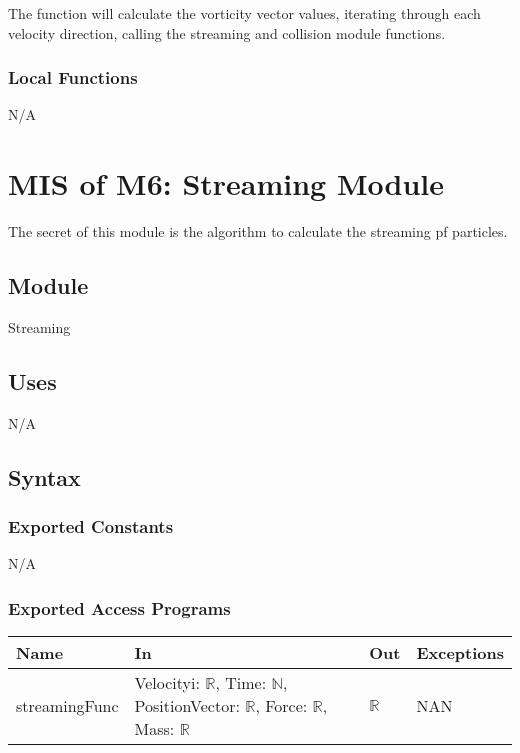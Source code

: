 \documentclass[12pt, titlepage]{article}
\begin{document}
The function will calculate the vorticity vector values, iterating through each velocity direction, calling the streaming and collision module functions.

\subsubsection{Local Functions}

N/A

\newpage

\section{MIS of M6: Streaming Module} \label{STModule}

The secret of this module is the algorithm to calculate the streaming pf particles.

\subsection{Module}

Streaming

\subsection{Uses}
N/A
\subsection{Syntax}

\subsubsection{Exported Constants}
N/A

\subsubsection{Exported Access Programs}

\begin{center}
	\begin{tabular}{p{3cm} p{3cm} p{3cm} p{2cm}}
		\hline
		\textbf{Name} & \textbf{In} & \textbf{Out} & \textbf{Exceptions} \\
		\hline
		streamingFunc & Velocityi: $\mathbb{R}$, Time: $\mathbb{N}$, PositionVector: $\mathbb{R}$, Force: $\mathbb{R}$, Mass: $\mathbb{R}$ & $\mathbb{R}$ & NAN \\
		\hline
	\end{tabular}
\end{center}
\end{document}
